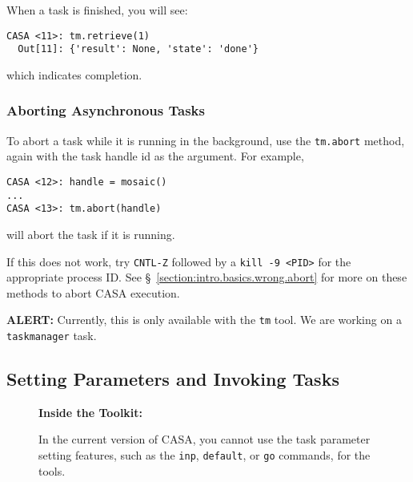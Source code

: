 When a task is finished, you will see:
\small
\begin{verbatim}
CASA <11>: tm.retrieve(1)
  Out[11]: {'result': None, 'state': 'done'}
\end{verbatim}
\normalsize
which indicates completion.

\subsubsection{Aborting Asynchronous Tasks}
\label{section:intro.tasks.async.abort}

To abort a task while it is running in the background, use the
{\tt tm.abort} method, again with the task handle id as the
argument.  For example,
\small
\begin{verbatim}
CASA <12>: handle = mosaic()
...
CASA <13>: tm.abort(handle)
\end{verbatim}
\normalsize
will abort the task if it is running.

If this does not work,
try {\tt CNTL-Z} followed by a {\tt kill -9 <PID>} for the appropriate
process ID.
See \S~\ref{section:intro.basics.wrong.abort} for more on these
methods to abort CASA execution.

{\bf ALERT:} Currently, this is only available with the 
{\tt tm} tool.  We are working on a {\tt taskmanager} task.

\subsection{Setting Parameters and Invoking Tasks}
\label{section:intro.tasks.setpar}

\begin{wrapfigure}{r}{2.5in}
  \begin{boxedminipage}{2.5in}
     \centerline{\bf Inside the Toolkit:}
     In the current version of CASA, you cannot use the
     task parameter setting features, such as the {\tt inp},
     {\tt default}, or {\tt go} commands, for the tools.
  \end{boxedminipage}
\end{wrapfigure}

